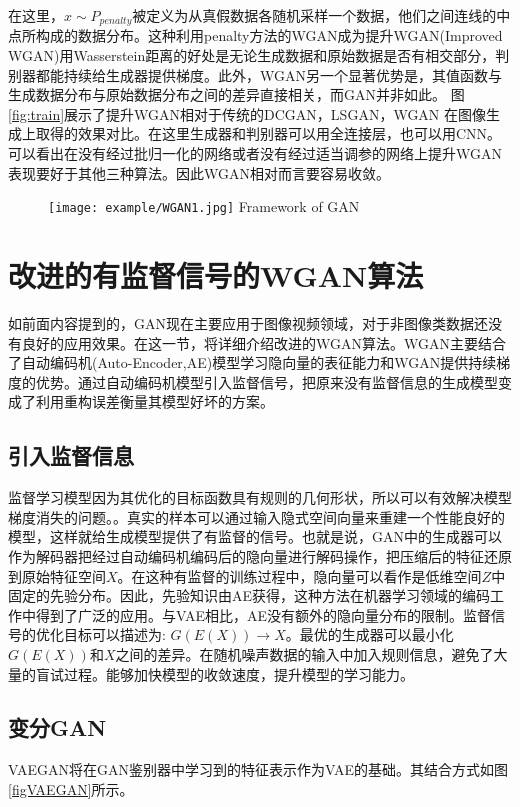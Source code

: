 在这里，$\hat{x}\sim P_{ {penalty}}$被定义为从真假数据各随机采样一个数据，他们之间连线的中点所构成的数据分布。这种利用penalty方法的WGAN成为提升WGAN(Improved WGAN)用Wasserstein距离的好处是无论生成数据和原始数据是否有相交部分，判别器都能持续给生成器提供梯度。此外，WGAN另一个显著优势是，其值函数与生成数据分布与原始数据分布之间的差异直接相关，而GAN并非如此。
图\ref{fig:train}展示了提升WGAN相对于传统的DCGAN，LSGAN，WGAN 在图像生成上取得的效果对比。在这里生成器和判别器可以用全连接层，也可以用CNN。可以看出在没有经过批归一化的网络或者没有经过适当调参的网络上提升WGAN表现要好于其他三种算法。因此WGAN相对而言要容易收敛。
\begin{figure}[!htp]
	\centering
	\texttt{[image: example/WGAN1.jpg]}
	\hspace{1cm}
	{Framework of GAN}
	\label{fig:GAN1}
\end{figure}

\section{改进的有监督信号的WGAN算法}
如前面内容提到的，GAN现在主要应用于图像视频领域，对于非图像类数据还没有良好的应用效果。在这一节，将详细介绍改进的WGAN算法。WGAN主要结合了自动编码机(Auto-Encoder,AE)模型学习隐向量的表征能力和WGAN提供持续梯度的优势。通过自动编码机模型引入监督信号，把原来没有监督信息的生成模型变成了利用重构误差衡量其模型好坏的方案。
\subsection{引入监督信息}
监督学习模型因为其优化的目标函数具有规则的几何形状，所以可以有效解决模型梯度消失的问题。\cite{11}。真实的样本可以通过输入隐式空间向量来重建一个性能良好的模型，这样就给生成模型提供了有监督的信号。也就是说，GAN中的生成器可以作为解码器把经过自动编码机编码后的隐向量进行解码操作，把压缩后的特征还原到原始特征空间$X$。在这种有监督的训练过程中，隐向量可以看作是低维空间$Z$中固定的先验分布。因此，先验知识由AE获得，这种方法在机器学习领域的编码工作中得到了广泛的应用。与VAE相比，AE没有额外的隐向量分布的限制。监督信号的优化目标可以描述为:  $ G(E(X))\rightarrow X $。最优的生成器可以最小化$ G(E(X))$和$X$之间的差异。在随机噪声数据的输入中加入规则信息，避免了大量的盲试过程。能够加快模型的收敛速度，提升模型的学习能力。
\subsection{变分GAN}
VAEGAN将在GAN鉴别器中学习到的特征表示作为VAE的基础。其结合方式如图\ref{figVAEGAN}所示。

